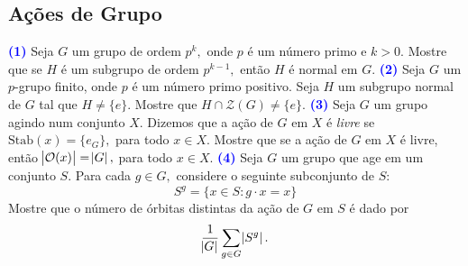 \documentclass[12pt, a4paper]{article}
\begin{document}
 \subsection{\textcolor{Floresta}{Ações de Grupo}}
 \textcolor{blue}{\bf(1)}\label{100} Seja $G$ um grupo de ordem $p^k,$ onde $p$ é um número primo e $k > 0.$ Mostre que se $H$ é um subgrupo de ordem $p^{k-1},$ então $H$ é normal em $G.$
 \newline\newline
\textcolor{blue}{\bf(2)}\label{101} Seja $G$ um $p$-grupo finito, onde $p$ é um número primo positivo. Seja $H$ um subgrupo normal de $G$ tal que $H \neq \{ e \}.$ Mostre que $H \cap \mathcal{Z}(G) \neq \{ e \}.$
 \newline\newline
\textcolor{blue}{\bf(3)}\label{102} Seja $G$ um grupo agindo num conjunto $X.$ Dizemos que a ação de $G$ em $X$ é \emph{livre} se $\mbox{Stab}(x) = \{ e_G \},$ para todo $x \in X.$ Mostre que se a ação de $G$ em $X$ é livre, então $\abs{\mathcal{O}(x)} = \abs{G},$ para todo $x \in X.$
 \newline\newline
\textcolor{blue}{\bf(4)}\label{103} Seja $G$ um grupo que age em um conjunto $S.$ Para cada $g \in G,$ considere o seguinte subconjunto de $S:$
\[
S^g = \{ x \in S \colon g \cdot x = x \}
\]
Mostre que o número de órbitas distintas da ação de $G$ em $S$ é dado por
\[
\frac{1}{\abs{G}} \sum\limits_{g \in G} \abs{S^g}.
\]
\end{document}
